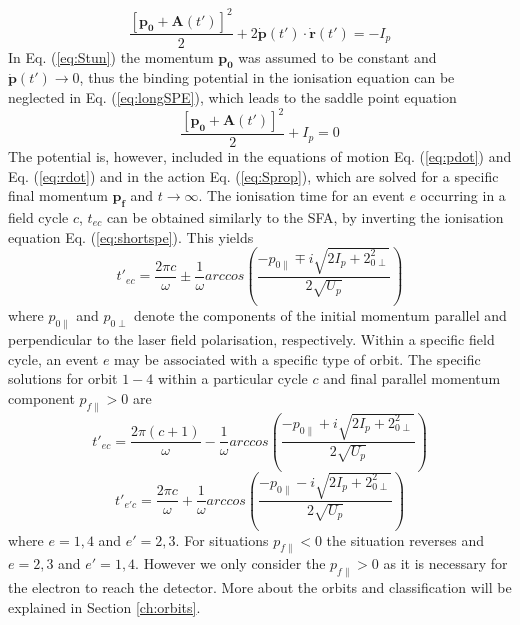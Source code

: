 \documentclass[11pt]{article}
\numberwithin{equation}{section}
\begin{document}
\begin{equation} \label{eq:longSPE}
    \frac{[\mathbf{p_0} + \mathbf{A}(t')]^2}{2} + 2 \dot{\mathbf{p}}(t') \cdot \dot{\mathbf{r}}(t') = -I_p
\end{equation}
In Eq. (\ref{eq:Stun}) the momentum $\mathbf{p_0}$ was assumed to be constant and $\dot{\mathbf{p}}(t') \rightarrow 0$, thus the binding potential in the ionisation equation can be neglected in Eq. (\ref{eq:longSPE}), which leads to the saddle point equation
\begin{equation}\label{eq:shortspe}
    \frac{[\mathbf{p_0} + \mathbf{A}(t')]^2}{2} + I_p = 0
\end{equation}
The potential is, however, included in the equations of motion Eq. (\ref{eq:pdot}) and Eq. (\ref{eq:rdot}) and in the action Eq. (\ref{eq:Sprop}), which are solved for a specific final momentum $\mathbf{p_f}$ and $t\rightarrow \infty$. The ionisation time for an event $e$ occurring in a field cycle $c$, $t_{ec}$ can be obtained similarly to the SFA, by inverting the ionisation equation Eq. (\ref{eq:shortspe}). This yields
\begin{equation}
    t'_{ec} = \frac{2\pi c}{\omega} \pm \frac{1}{\omega} arccos \left ( \frac{-p_{0\parallel} \mp i \sqrt{2I_p + 2_{0\perp}^2}}{2 \sqrt{U_p}} \right )
\end{equation}
where $p_{0\parallel}$ and $p_{0\perp}$ denote the components of the initial momentum parallel and perpendicular to the laser field polarisation, respectively. Within a specific field cycle, an event $e$ may be associated with a specific type of orbit. The specific solutions for orbit $1 - 4$ within a particular cycle $c$ and final parallel momentum component $p_{f\parallel} > 0$ are
\begin{equation}
    t'_{ec} = \frac{2\pi (c+1)}{\omega} - \frac{1}{\omega} arccos \left ( \frac{-p_{0\parallel} + i \sqrt{2I_p + 2_{0\perp}^2}}{2 \sqrt{U_p}} \right )
\end{equation}
\begin{equation}
    t'_{e'c} = \frac{2\pi c}{\omega} + \frac{1}{\omega} arccos \left ( \frac{-p_{0\parallel} - i \sqrt{2I_p + 2_{0\perp}^2}}{2 \sqrt{U_p}} \right )
\end{equation}
where $e = 1, 4$ and $e' = 2, 3$. For situations $p_{f\parallel} < 0$ the situation reverses and $e = 2, 3$ and $e' = 1, 4$. However we only consider the $p_{f\parallel} > 0$ as it is necessary for the electron to reach the detector. More about the orbits and classification will be explained in Section \ref{ch:orbits}.
\end{document}

